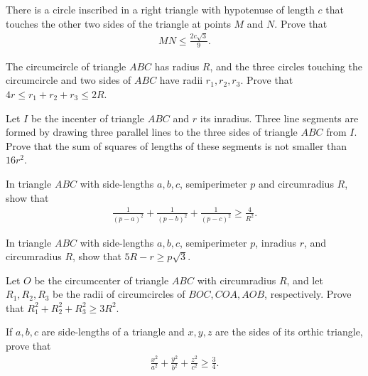 \documentclass[12pt,a4paper]{memoir}
\theoremstyle{definition}
\begin{document}
\begin{question}
	There is a circle inscribed in a right triangle with hypotenuse of length $c$ that touches the other two sides of the triangle at points $M$ and $N$. Prove that
	\begin{align*}
		MN \leq \frac{2c\sqrt{3}}{9}.
	\end{align*}
\end{question}




\begin{question}
	The circumcircle of triangle $ABC$ has radius $R$, and the three circles touching the circumcircle and two sides of $ABC$ have radii $r_1,r_2,r_3$. Prove that $4r \leq r_1+r_2+r_3\leq 2R$.
\end{question}

\begin{question}
	Let $I$ be the incenter of triangle $ABC$ and $r$ its inradius. Three line segments are formed by drawing three parallel lines to the three sides of triangle $ABC$ from $I$. Prove that the sum of squares of lengths of these segments is not smaller than $16r^2$.
\end{question}

\begin{question}
	In triangle $ABC$ with side-lengths $a,b,c$, semiperimeter $p$ and circumradius $R$, show that
	\begin{align*}
		\frac{1}{(p-a)^2}+\frac{1}{(p-b)^2}+\frac{1}{(p-c)^2} \geq \frac{4}{R^2}.
	\end{align*}
\end{question}


\begin{question}
	In triangle $ABC$ with side-lengths $a,b,c$, semiperimeter $p$, inradius $r$, and circumradius $R$, show that $5R-r \geq p \sqrt{3}$.
\end{question}


\begin{question}
	Let $O$ be the circumcenter of triangle $ABC$ with circumradius $R$, and let $R_1,R_2,R_3$ be the radii of circumcircles of $BOC, COA, AOB$, respectively. Prove that $R_1^2 + R_2^2 + R_3^2 \geq 3R^2$.
\end{question}


\begin{question}
	If $a,b,c$ are side-lengths of a triangle and $x,y,z$ are the sides of its orthic triangle, prove that
	\begin{align*}
		\frac{x^2}{a^2}+\frac{y^2}{b^2}+\frac{z^2}{c^2} \geq \frac{3}{4}.
	\end{align*}
\end{question}
\end{document}
